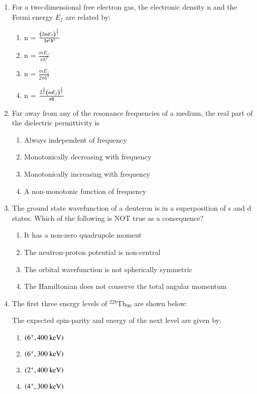 \documentclass[journal]{IEEEtran}
\begin{document}
\begin{enumerate}
\item For a two-dimensional free electron gas, the electronic density n and the Fermi energy $E_f$ are related by:
\begin{multicols}{2}
\begin{enumerate}
\item n = $\frac{\left(2mE_f\right)^{\frac{3}{2}}}{3\pi^2\hbar^3}$\\

\item n = $\frac{mE_f}{\pi\hbar^2}$

\item n = $\frac{mE_f}{2\pi\hbar^2}$\\

\item n = $\frac{2^{\frac{3}{2}}\left(mE_f\right)^{\frac{1}{2}}}{\pi\hbar}$

\end{enumerate}
\end{multicols}

\item Far away from any of the resonance frequencies of a medium, the real part of the dielectric permittivity is
\begin{enumerate}
\item Always independent of frequency
\item Monotonically decreasing with frequency
\item Monotonically increasing with frequency
\item A non-monotonic function of frequency
\end{enumerate}

\item The ground state wavefunction of a deuteron is in a superposition of s and d states. Which of the following is NOT true as a consequence?
\begin{enumerate}
\item It has a non-zero quadrupole moment
\item The neutron-proton potential is non-central
\item The orbital wavefunction is not spherically symmetric
\item The Hamiltonian does not conserve the total angular momentum
\end{enumerate}

\item The first three energy levels of $^{228}\text{Th}_{90}$ are shown below:


The expected spin-parity and energy of the next level are given by:
\begin{multicols}{2}
\begin{enumerate}
\item $\left(6^+, 400 \text{ keV}\right)$
\item $\left(6^+, 300 \text{ keV}\right)$
\item $\left(2^+, 400 \text{ keV}\right)$
\item $\left(4^+, 300 \text{ keV}\right)$
\end{enumerate} 
\end{multicols}


\end{enumerate}
\end{document}
